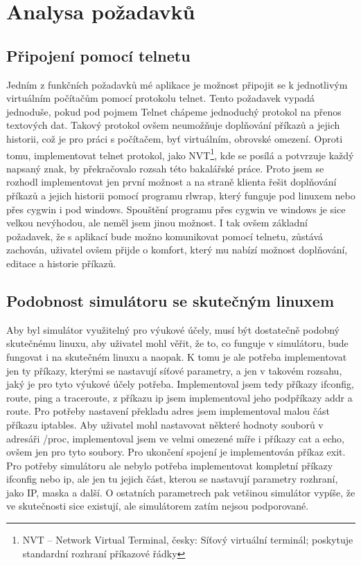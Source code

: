
\section{Analysa požadavků}

\subsection{Připojení pomocí telnetu}

Jedním z funkčních požadavků mé aplikace je možnost připojit se k jednotlivým virtuálním počítačům pomocí protokolu telnet. Tento požadavek vypadá jednoduše, pokud pod pojmem Telnet chápeme jednoduchý protokol na přenos textových dat. Takový protokol ovšem neumožňuje doplňování příkazů a jejich historii, což je pro práci s počítačem, byť virtuálním, obrovské omezení. Oproti tomu, implementovat telnet protokol, jako NVT\footnote{NVT – Network Virtual Terminal, česky: Síťový virtuální terminál; poskytuje standardní rozhraní příkazové řádky}, kde se posílá a potvrzuje každý napsaný znak, by překračovalo rozsah této bakalářské práce. Proto jsem se rozhodl implementovat jen první možnost a na straně klienta řešit doplňování příkazů a jejich historii pomocí programu rlwrap, který funguje pod linuxem nebo přes cygwin i pod windows. Spouštění programu přes cygwin ve windows je sice velkou nevýhodou, ale neměl jsem jinou možnost. I tak ovšem základní požadavek, že s aplikací bude možno komunikovat pomocí telnetu, zůstává zachován, uživatel ovšem přijde o komfort, který mu nabízí možnost doplňování, editace a historie příkazů. 

\subsection{Podobnost simulátoru se skutečným linuxem}

Aby byl simulátor využitelný pro výukové účely, musí být dostatečně podobný skutečnému linuxu, aby uživatel mohl věřit, že to, co funguje v simulátoru, bude fungovat i na skutečném linuxu a naopak. K tomu je ale potřeba implementovat jen ty příkazy, kterými se nastavují síťové parametry, a jen v takovém rozsahu, jaký je pro tyto výukové účely potřeba. Implementoval jsem tedy příkazy ifconfig, route, ping a traceroute, z příkazu ip jsem implementoval jeho podpříkazy addr a route. Pro potřeby nastavení překladu adres jsem implementoval malou část příkazu iptables. Aby uživatel mohl nastavovat některé hodnoty souborů v adresáři /proc, implementoval jsem ve velmi omezené míře i příkazy cat a echo, ovšem jen pro tyto soubory. Pro ukončení spojení je implementován příkaz exit. Pro potřeby simulátoru ale nebylo potřeba implementovat kompletní příkazy ifconfig nebo ip, ale jen tu jejich část, kterou se nastavují parametry rozhraní, jako IP, maska a další. O ostatních parametrech pak vetšinou simulátor vypíše, že ve skutečnosti sice existují, ale simulátorem zatím nejsou podporované.

